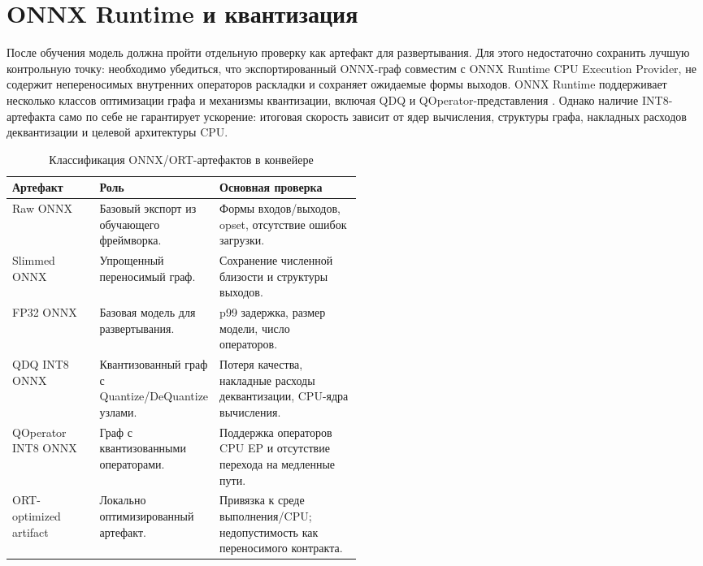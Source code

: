 \documentclass[12pt,a4paper,oneside,openany]{report}
\begin{document}

\section{ONNX Runtime и квантизация}

После обучения модель должна пройти отдельную проверку как артефакт для развертывания. Для этого
недостаточно сохранить лучшую контрольную точку: необходимо убедиться, что экспортированный
ONNX-граф совместим с ONNX Runtime CPU Execution Provider, не содержит непереносимых внутренних
операторов раскладки и сохраняет ожидаемые формы выходов. ONNX Runtime поддерживает несколько
классов оптимизации графа и механизмы квантизации, включая QDQ и QOperator-представления
\cite{ort_graph_optim,ort_quantization}. Однако наличие INT8-артефакта само по себе не
гарантирует ускорение: итоговая скорость зависит от ядер вычисления, структуры графа, накладных
расходов деквантизации и целевой архитектуры CPU.

\begin{table}[!htbp]
  \centering
  \caption{Классификация ONNX/ORT-артефактов в конвейере}
  \label{tab:onnx_artifact_taxonomy}
  \small
  \begin{tabularx}{\linewidth}{@{}P{0.25\linewidth}P{0.25\linewidth}Y@{}}
    \toprule
    Артефакт & Роль & Основная проверка \\
    \midrule
    Raw ONNX &
    Базовый экспорт из обучающего фреймворка. &
    Формы входов/выходов, opset, отсутствие ошибок загрузки. \\
    Slimmed ONNX &
    Упрощенный переносимый граф. &
    Сохранение численной близости и структуры выходов. \\
    FP32 ONNX &
    Базовая модель для развертывания. &
    p99 задержка, размер модели, число операторов. \\
    QDQ INT8 ONNX &
    Квантизованный граф с Quantize/DeQuantize узлами. &
    Потеря качества, накладные расходы деквантизации, CPU-ядра вычисления. \\
    QOperator INT8 ONNX &
    Граф с квантизованными операторами. &
    Поддержка операторов CPU EP и отсутствие перехода на медленные пути. \\
    ORT-optimized artifact &
    Локально оптимизированный артефакт. &
    Привязка к среде выполнения/CPU; недопустимость как переносимого контракта. \\
    \bottomrule
  \end{tabularx}
\end{table}
\end{document}
